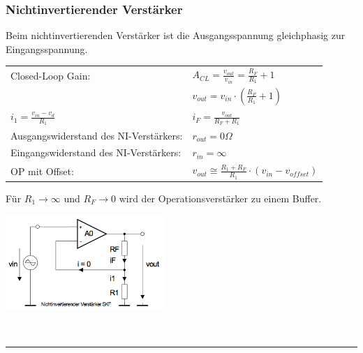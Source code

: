 	\subsubsection{Nichtinvertierender Verstärker}
			Beim nichtinvertierenden Verstärker ist die Ausgangsspannung
      gleichphasig zur Eingangsspannung.\\ 
	 \begin{minipage}[T]{12cm}
      	
        \begin{tabular}{ll}
        	Closed-Loop Gain: &
        	$A_{CL}=\frac{v_{out}}{v_{in}}=\frac{R_F}{R_1}+1$\\
        	& $v_{out} = v_{in}\cdot(\frac{R_F}{R_1}+1)$ \\
        	$i_1=\frac{v_{in}-v_d}{R_1}$ &
        	$i_F=\frac{v_{out}}{R_F+R_1}$\\
          Ausgangswiderstand des NI-Verstärkers: &
          $r_{out}=0\Omega$\\
          Eingangswiderstand des NI-Verstärkers: &
          $r_{in}=\infty$\\
          OP mit Offset: &
          $v_{out} \cong \frac{R_1+R_F}{R_1} \cdot (v_{in}-v_{offset})$\\
        \end{tabular}
        Für $R_1 \to \infty$ und $R_F \to 0$ wird der Operationsverstärker zu einem
        Buffer.          	
      \end{minipage}
			\begin{minipage}{6cm}
      	\includegraphics[width=6cm]{./images/ni-verstaerker.png}
      \end{minipage}\\
\hrule

